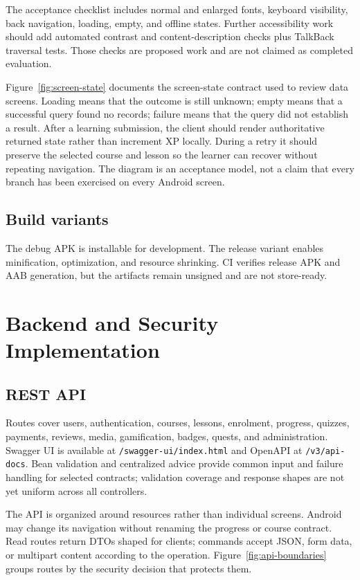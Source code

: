 \documentclass[12pt,a4paper,oneside]{report}
\begin{document}
The acceptance checklist includes normal and enlarged fonts, keyboard visibility,
back navigation, loading, empty, and offline states. Further accessibility work should
add automated contrast and content-description checks plus TalkBack traversal tests.
Those checks are proposed work and are not claimed as completed evaluation.

\screenstatediagram

Figure~\ref{fig:screen-state} documents the screen-state contract used to review data
screens. Loading means that the outcome is still unknown; empty means that a successful
query found no records; failure means that the query did not establish a result.
After a learning submission, the client should render authoritative returned state
rather than increment XP locally. During a retry it should preserve the selected
course and lesson so the learner can recover without repeating navigation.
The diagram is an acceptance model, not a claim that every branch has been exercised
on every Android screen.

\section{Build variants}
The debug APK is installable for development. The release variant enables minification,
optimization, and resource shrinking. CI verifies release APK and AAB generation,
but the artifacts remain unsigned and are not store-ready.

\chapter{Backend and Security Implementation}
\section{REST API}
Routes cover users, authentication, courses, lessons, enrolment, progress, quizzes,
payments, reviews, media, gamification, badges, quests, and administration.
Swagger UI is available at \texttt{/swagger-ui/index.html} and OpenAPI at
\texttt{/v3/api-docs}. Bean validation and centralized advice provide common input
and failure handling for selected contracts; validation coverage and response shapes
are not yet uniform across all controllers.

The API is organized around resources rather than individual screens. Android may
change its navigation without renaming the progress or course contract. Read routes
return DTOs shaped for clients; commands accept JSON, form data, or multipart content
according to the operation. Figure~\ref{fig:api-boundaries} groups routes by the
security decision that protects them.
\end{document}
